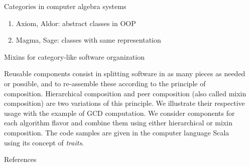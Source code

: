 \documentclass[final]{beamer}
\begin{document}
\begin{frame}[fragile]
\begin{columns}[t]
\begin{column}{.3\linewidth}
\begin{block}{\large Categories in computer algebra systems}
\begin{enumerate}
  \item Axiom, Aldor: abstract classes in OOP
        \cite{JenksSutor:1992, Watt:2003}
  \item Magma, Sage: classes with same representation
        \cite{BosmaCannonPlayoust:1997, Stein:2005}
  \end{enumerate}
  \end{block}
  \hfill
  \begin{block}{\large Mixins for category-like software organization}
{\scriptsize
Reusable components \cite{Odersky:2005} consist in splitting software in
as many pieces as needed or possible, and to re-assemble these according
to the principle of composition. Hierarchical composition and peer
composition (also called mixin composition) are two variations of this
principle. We illustrate their respective usage with the example of GCD
computation. We consider components for each algorithm flavor and combine
them using either hierarchical or mixin composition. The code samples are
given in the computer language Scala using its concept of
{\em traits}.
\par}\par
  \end{block}
\hfill
  \begin{block}{\large References}
\scriptsize


  \end{block}
\end{column}


\begin{column}{.3\linewidth}


\end{column}
\end{columns}
\end{frame}
\end{document}
